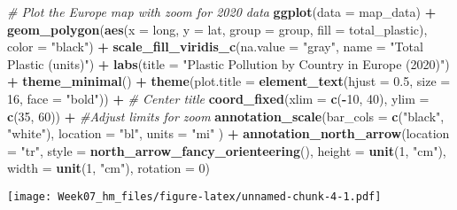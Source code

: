 \documentclass[
]{article}
\newenvironment{Shaded}{\begin{snugshade}}{\end{snugshade}}
\newcommand{\AttributeTok}[1]{\textcolor[rgb]{0.13,0.29,0.53}{#1}}
\newcommand{\CommentTok}[1]{\textcolor[rgb]{0.56,0.35,0.01}{\textit{#1}}}
\newcommand{\DecValTok}[1]{\textcolor[rgb]{0.00,0.00,0.81}{#1}}
\newcommand{\FloatTok}[1]{\textcolor[rgb]{0.00,0.00,0.81}{#1}}
\newcommand{\FunctionTok}[1]{\textcolor[rgb]{0.13,0.29,0.53}{\textbf{#1}}}
\newcommand{\NormalTok}[1]{#1}
\newcommand{\SpecialCharTok}[1]{\textcolor[rgb]{0.81,0.36,0.00}{\textbf{#1}}}
\newcommand{\StringTok}[1]{\textcolor[rgb]{0.31,0.60,0.02}{#1}}
\begin{document}
\begin{Shaded}
\begin{Highlighting}[]
\CommentTok{\# Plot the Europe map with zoom for 2020 data}
\FunctionTok{ggplot}\NormalTok{(}\AttributeTok{data =}\NormalTok{ map\_data) }\SpecialCharTok{+}
  \FunctionTok{geom\_polygon}\NormalTok{(}\FunctionTok{aes}\NormalTok{(}\AttributeTok{x =}\NormalTok{ long, }\AttributeTok{y =}\NormalTok{ lat, }\AttributeTok{group =}\NormalTok{ group, }\AttributeTok{fill =}\NormalTok{ total\_plastic), }\AttributeTok{color =} \StringTok{"black"}\NormalTok{) }\SpecialCharTok{+}
  \FunctionTok{scale\_fill\_viridis\_c}\NormalTok{(}\AttributeTok{na.value =} \StringTok{"gray"}\NormalTok{, }\AttributeTok{name =} \StringTok{"Total Plastic (units)"}\NormalTok{) }\SpecialCharTok{+}
  \FunctionTok{labs}\NormalTok{(}\AttributeTok{title =} \StringTok{"Plastic Pollution by Country in Europe (2020)"}\NormalTok{) }\SpecialCharTok{+}
  \FunctionTok{theme\_minimal}\NormalTok{() }\SpecialCharTok{+}
    \FunctionTok{theme}\NormalTok{(}\AttributeTok{plot.title =} \FunctionTok{element\_text}\NormalTok{(}\AttributeTok{hjust =} \FloatTok{0.5}\NormalTok{, }\AttributeTok{size =} \DecValTok{16}\NormalTok{, }\AttributeTok{face =} \StringTok{"bold"}\NormalTok{)) }\SpecialCharTok{+}  \CommentTok{\# Center title}
  \FunctionTok{coord\_fixed}\NormalTok{(}\AttributeTok{xlim =} \FunctionTok{c}\NormalTok{(}\SpecialCharTok{{-}}\DecValTok{10}\NormalTok{, }\DecValTok{40}\NormalTok{), }\AttributeTok{ylim =} \FunctionTok{c}\NormalTok{(}\DecValTok{35}\NormalTok{, }\DecValTok{60}\NormalTok{)) }\SpecialCharTok{+} \CommentTok{\#Adjust limits for zoom}
  \FunctionTok{annotation\_scale}\NormalTok{(}\AttributeTok{bar\_cols =} \FunctionTok{c}\NormalTok{(}\StringTok{"black"}\NormalTok{, }\StringTok{"white"}\NormalTok{), }\AttributeTok{location =} \StringTok{"bl"}\NormalTok{, }\AttributeTok{units =} \StringTok{"mi"}\NormalTok{ ) }\SpecialCharTok{+}
  \FunctionTok{annotation\_north\_arrow}\NormalTok{(}\AttributeTok{location =} \StringTok{"tr"}\NormalTok{,}
                       \AttributeTok{style =} \FunctionTok{north\_arrow\_fancy\_orienteering}\NormalTok{(),}
                       \AttributeTok{height =} \FunctionTok{unit}\NormalTok{(}\DecValTok{1}\NormalTok{, }\StringTok{"cm"}\NormalTok{),}
                       \AttributeTok{width =} \FunctionTok{unit}\NormalTok{(}\DecValTok{1}\NormalTok{, }\StringTok{"cm"}\NormalTok{),}
                       \AttributeTok{rotation =} \DecValTok{0}\NormalTok{)  }
\end{Highlighting}
\end{Shaded}

\texttt{[image: Week07\_hm\_files/figure-latex/unnamed-chunk-4-1.pdf]}
\end{document}
